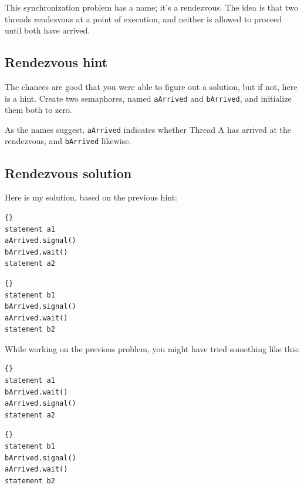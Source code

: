 \documentclass{book}
\begin{document}
This synchronization problem has a name; it's a
rendezvous.  The idea is that two threads rendezvous
at a point of execution, and neither is allowed to proceed
until both have arrived.



\subsection{Rendezvous hint}

The chances are good that you were able to figure out a solution,
but if not, here is a hint.  Create two semaphores, named {\tt aArrived}
and {\tt bArrived}, and initialize them both to zero.

As the names suggest, {\tt aArrived} indicates whether Thread A
has arrived at the rendezvous, and {\tt bArrived} likewise.


\subsection{Rendezvous solution}

Here is my solution, based on the previous hint:

\begin{minipage}[t]{0.4\textwidth}
    \begin{lstlisting}[title={Thread A}]{}
statement a1
aArrived.signal()
bArrived.wait()
statement a2
\end{lstlisting}
\end{minipage}
\hfill
\begin{minipage}[t]{0.4\textwidth}
    \begin{lstlisting}[title={Thread B}]{}
statement b1
bArrived.signal()
aArrived.wait()
statement b2
\end{lstlisting}
\end{minipage}

While working on the previous problem, you might have
tried something like this:

\begin{minipage}[t]{0.4\textwidth}
    \begin{lstlisting}[title={Thread A}]{}
statement a1
bArrived.wait()
aArrived.signal()
statement a2
\end{lstlisting}
\end{minipage}
\hfill
\begin{minipage}[t]{0.4\textwidth}
    \begin{lstlisting}[title={Thread B}]{}
statement b1
bArrived.signal()
aArrived.wait()
statement b2
\end{lstlisting}
\end{minipage}
\end{document}
